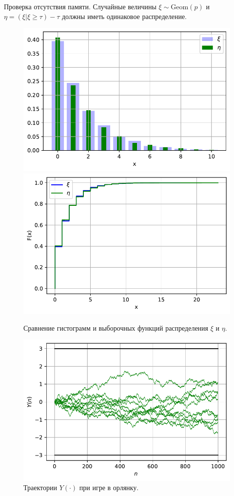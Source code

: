 \documentclass[16pt]{article}
\newcommand\A{(\cdot)}
\begin{document}
Проверка отсутствия памяти. Случайные величины $\xi \sim \mathrm{Geom}(p)$ и $\eta = (\xi | \xi \geq \tau) - \tau$ должны иметь одинаковое распределение.
\begin{figure}[h]
	\center
    \includegraphics[scale=0.5]{1_2.pdf}
    \hfill
    \includegraphics[scale=0.5]{1_3.pdf}
    \caption{Сравнение гистограмм и выборочных функций распределения $\xi$ и $\eta$.}
\end{figure}

\begin{figure}[h]
	\center
    \includegraphics[scale=0.7]{1_4.pdf}
    \caption{Траектории $Y\A$ при игре в орлянку.}
\end{figure}
\end{document}
